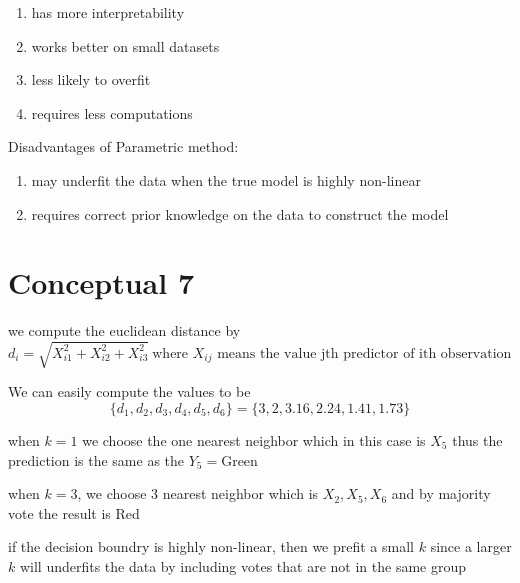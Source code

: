 \documentclass{article}
\begin{document}
\begin{enumerate}
  \item has more interpretability
  \item works better on small datasets
  \item less likely to overfit
  \item requires less computations
\end{enumerate}
Disadvantages of Parametric method:
\begin{enumerate}
  \item may underfit the data when the true model is highly non-linear
  \item requires correct prior knowledge on the data to construct the model
\end{enumerate}

\section*{Conceptual 7}
we compute the euclidean distance by
\[
  d_i = \sqrt{X_{i1}^2 + X_{i2}^2 + X_{i3}^2}~\text{where } X_{ij} \text{ means the value jth predictor of ith observation }
\]

We can easily compute the values to be
\[\{d_1, d_2, d_3, d_4, d_5, d_6\} = \{3,2,3.16,2.24,1.41,1.73\}\]

when \(k=1\) we choose the one nearest neighbor which in this case is \(X_5\) thus the prediction is the same as the \(Y_5 = \text{Green}\)

when \(k=3\), we choose 3 nearest neighbor which is \(X_2, X_5, X_6\) and by majority vote the result is Red

if the decision boundry is highly non-linear, then we prefit a small \(k\) since a larger \(k\) will underfits the data by including votes that are not in the same group



\newpage
\end{document}
